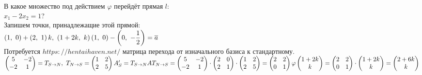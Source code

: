 \documentclass[12pt, letterpaper, twoside]{article}
\begin{document}
        В какое множество под действием $\varphi$ перейдёт прямая $l$:\\
        $x_1 - 2x_2 = 1$?\\
        Запишем точки, принадлежащие этой прямой:\\
        $(1,\ 0) + \left(2,\ 1\right)k,\ \left(1 + 2k,\ k\right)\\
        (1,\ 0) - \left(0,\ -\dfrac{1}{2}\right) = \overline{a}$\\
        Потребуется $https://hentaihaven.net/$ матрица перехода от изначального базиса к стандартному.\\
        $\begin{pmatrix}
            5 & -2\\
            -2 & 1
        \end{pmatrix} = T_{S\rightarrow N},\ T_{N\rightarrow S} = \begin{pmatrix}
            1 & 2\\
            2 & 5
        \end{pmatrix}\\
        A_S' = T_{S\rightarrow N}A T_{N\rightarrow S} = \begin{pmatrix}
            5 & -2\\
            -2 & 1
        \end{pmatrix}\cdot \begin{pmatrix}
            2 & 0\\
            2 & 1
        \end{pmatrix}\cdot \begin{pmatrix}
            1 & 2\\
            2 & 5
        \end{pmatrix} = \begin{pmatrix}
            2 & 2\\
            0 & 1
        \end{pmatrix}\\
        \varphi\begin{pmatrix}
            1 + 2k\\
            k
        \end{pmatrix} = \begin{pmatrix}
            2 & 2\\
            0 & 1
        \end{pmatrix}\cdot \begin{pmatrix}
            1 + 2k\\
            k
        \end{pmatrix} = \begin{pmatrix}
            2 + 6k\\
            k
        \end{pmatrix}$
\end{document}
